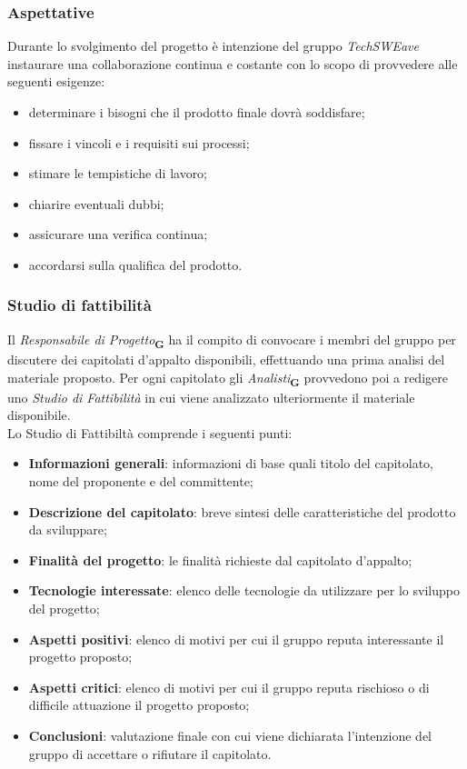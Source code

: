 \subsubsection{Aspettative}
Durante lo svolgimento del progetto è intenzione del gruppo \textit{TechSWEave} instaurare una collaborazione continua e costante con lo scopo di provvedere alle seguenti esigenze:
\begin{itemize}
    \item determinare i bisogni che il prodotto finale dovrà soddisfare;
    \item fissare i vincoli e i requisiti sui processi;
    \item stimare le tempistiche di lavoro;
    \item chiarire eventuali dubbi;
    \item assicurare una verifica continua;
    \item accordarsi sulla qualifica del prodotto.
\end{itemize}
\subsubsection{Studio di fattibilità}
Il \textit{Responsabile di Progetto}\textsubscript{\textbf{G}} ha il compito di convocare i membri del gruppo per discutere dei capitolati d’appalto disponibili, effettuando una prima analisi del materiale proposto. Per ogni capitolato gli \textit{Analisti}\textsubscript{\textbf{G}} provvedono poi a redigere uno \textit{Studio di Fattibilità} in cui viene analizzato ulteriormente il materiale disponibile.
\\Lo Studio di Fattibiltà comprende i seguenti punti:
\begin{itemize}
    \item \textbf{Informazioni generali}: informazioni di base quali titolo del capitolato, nome del proponente e del committente;
    \item \textbf{Descrizione del capitolato}: breve sintesi delle caratteristiche del prodotto da sviluppare;
    \item \textbf{Finalità del progetto}: le finalità richieste dal capitolato d’appalto;
    \item \textbf{Tecnologie interessate}: elenco delle tecnologie da utilizzare per lo sviluppo del progetto;
    \item \textbf{Aspetti positivi}: elenco di motivi per cui il gruppo reputa interessante il progetto proposto;
    \item \textbf{Aspetti critici}: elenco di motivi per cui il gruppo reputa rischioso o di difficile attuazione il progetto proposto;
    \item \textbf{Conclusioni}: valutazione finale con cui viene dichiarata l’intenzione del gruppo di accettare o rifiutare il capitolato.
\end{itemize}
